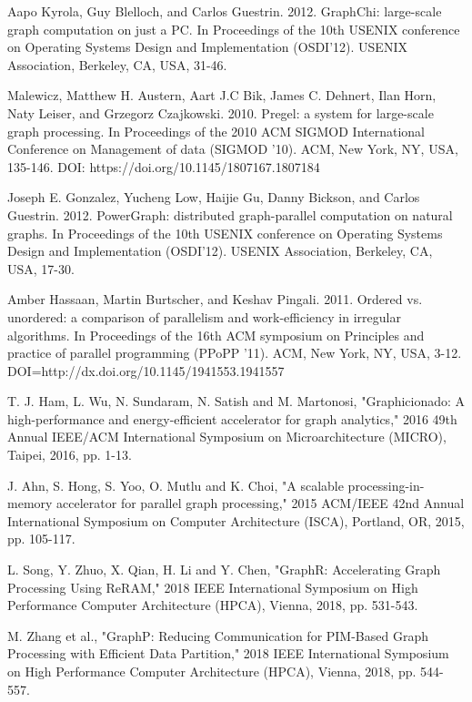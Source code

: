 \documentclass[journal,onecolumn]{IEEEtran}
\begin{document}
\begin{thebibliography}{10}

 Aapo Kyrola, Guy Blelloch, and Carlos Guestrin. 2012. GraphChi: large-scale graph computation on just a PC. In Proceedings of the 10th USENIX conference on Operating Systems Design and Implementation (OSDI'12). USENIX Association, Berkeley, CA, USA, 31-46.

 Malewicz, Matthew H. Austern, Aart J.C Bik, James C. Dehnert, Ilan Horn, Naty Leiser, and Grzegorz Czajkowski. 2010. Pregel: a system for large-scale graph processing. In Proceedings of the 2010 ACM SIGMOD International Conference on Management of data (SIGMOD '10). ACM, New York, NY, USA, 135-146. DOI: https://doi.org/10.1145/1807167.1807184

 Joseph E. Gonzalez, Yucheng Low, Haijie Gu, Danny Bickson, and Carlos Guestrin. 2012. PowerGraph: distributed graph-parallel computation on natural graphs. In Proceedings of the 10th USENIX conference on Operating Systems Design and Implementation (OSDI'12). USENIX Association, Berkeley, CA, USA, 17-30.

 Amber Hassaan, Martin Burtscher, and Keshav Pingali. 2011. Ordered vs. unordered: a comparison of parallelism and work-efficiency in irregular algorithms. In Proceedings of the 16th ACM symposium on Principles and practice of parallel programming (PPoPP '11). ACM, New York, NY, USA, 3-12. DOI=http://dx.doi.org/10.1145/1941553.1941557

 T. J. Ham, L. Wu, N. Sundaram, N. Satish and M. Martonosi, "Graphicionado: A high-performance and energy-efficient accelerator for graph analytics," 2016 49th Annual IEEE/ACM International Symposium on Microarchitecture (MICRO), Taipei, 2016, pp. 1-13.

J. Ahn, S. Hong, S. Yoo, O. Mutlu and K. Choi, "A scalable processing-in-memory accelerator for parallel graph processing," 2015 ACM/IEEE 42nd Annual International Symposium on Computer Architecture (ISCA), Portland, OR, 2015, pp. 105-117.

 L. Song, Y. Zhuo, X. Qian, H. Li and Y. Chen, "GraphR: Accelerating Graph Processing Using ReRAM," 2018 IEEE International Symposium on High Performance Computer Architecture (HPCA), Vienna, 2018, pp. 531-543.

 M. Zhang et al., "GraphP: Reducing Communication for PIM-Based Graph Processing with Efficient Data Partition," 2018 IEEE International Symposium on High Performance Computer Architecture (HPCA), Vienna, 2018, pp. 544-557.


\end{thebibliography}
\end{document}
